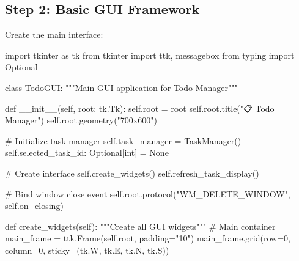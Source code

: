 \documentclass[
  letterpaper,
  DIV=11,
  numbers=noendperiod,
  oneside]{scrreprt}
\newenvironment{Shaded}{}{}
\newcommand{\BuiltInTok}[1]{\textcolor[rgb]{0.84,0.23,0.29}{#1}}
\newcommand{\CommentTok}[1]{\textcolor[rgb]{0.42,0.45,0.49}{#1}}
\newcommand{\DecValTok}[1]{\textcolor[rgb]{0.00,0.36,0.77}{#1}}
\newcommand{\FunctionTok}[1]{\textcolor[rgb]{0.44,0.26,0.76}{#1}}
\newcommand{\ImportTok}[1]{\textcolor[rgb]{0.01,0.18,0.38}{#1}}
\newcommand{\KeywordTok}[1]{\textcolor[rgb]{0.84,0.23,0.29}{#1}}
\newcommand{\NormalTok}[1]{\textcolor[rgb]{0.14,0.16,0.18}{#1}}
\newcommand{\OperatorTok}[1]{\textcolor[rgb]{0.14,0.16,0.18}{#1}}
\newcommand{\StringTok}[1]{\textcolor[rgb]{0.01,0.18,0.38}{#1}}
\newcommand{\VariableTok}[1]{\textcolor[rgb]{0.89,0.38,0.04}{#1}}
\begin{document}
\subsection{Step 2: Basic GUI
Framework}\label{step-2-basic-gui-framework}

Create the main interface:

\begin{Shaded}
\begin{Highlighting}[]
\ImportTok{import}\NormalTok{ tkinter }\ImportTok{as}\NormalTok{ tk}
\ImportTok{from}\NormalTok{ tkinter }\ImportTok{import}\NormalTok{ ttk, messagebox}
\ImportTok{from}\NormalTok{ typing }\ImportTok{import}\NormalTok{ Optional}

\KeywordTok{class}\NormalTok{ TodoGUI:}
    \CommentTok{"""Main GUI application for Todo Manager"""}
    
    \KeywordTok{def} \FunctionTok{\_\_init\_\_}\NormalTok{(}\VariableTok{self}\NormalTok{, root: tk.Tk):}
        \VariableTok{self}\NormalTok{.root }\OperatorTok{=}\NormalTok{ root}
        \VariableTok{self}\NormalTok{.root.title(}\StringTok{"📋 Todo Manager"}\NormalTok{)}
        \VariableTok{self}\NormalTok{.root.geometry(}\StringTok{"700x600"}\NormalTok{)}
        
        \CommentTok{\# Initialize task manager}
        \VariableTok{self}\NormalTok{.task\_manager }\OperatorTok{=}\NormalTok{ TaskManager()}
        \VariableTok{self}\NormalTok{.selected\_task\_id: Optional[}\BuiltInTok{int}\NormalTok{] }\OperatorTok{=} \VariableTok{None}
        
        \CommentTok{\# Create interface}
        \VariableTok{self}\NormalTok{.create\_widgets()}
        \VariableTok{self}\NormalTok{.refresh\_task\_display()}
        
        \CommentTok{\# Bind window close event}
        \VariableTok{self}\NormalTok{.root.protocol(}\StringTok{"WM\_DELETE\_WINDOW"}\NormalTok{, }\VariableTok{self}\NormalTok{.on\_closing)}
    
    \KeywordTok{def}\NormalTok{ create\_widgets(}\VariableTok{self}\NormalTok{):}
        \CommentTok{"""Create all GUI widgets"""}
        \CommentTok{\# Main container}
\NormalTok{        main\_frame }\OperatorTok{=}\NormalTok{ ttk.Frame(}\VariableTok{self}\NormalTok{.root, padding}\OperatorTok{=}\StringTok{"10"}\NormalTok{)}
\NormalTok{        main\_frame.grid(row}\OperatorTok{=}\DecValTok{0}\NormalTok{, column}\OperatorTok{=}\DecValTok{0}\NormalTok{, sticky}\OperatorTok{=}\NormalTok{(tk.W, tk.E, tk.N, tk.S))}
        

\end{Highlighting}
\end{Shaded}
\end{document}
